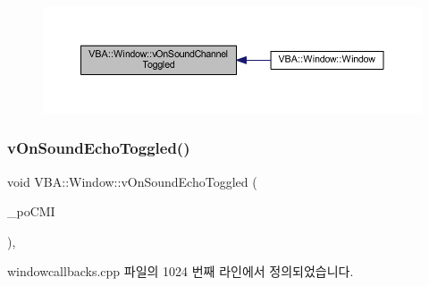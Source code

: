 \begin{figure}[H]
\begin{center}
\leavevmode
\includegraphics[width=350pt]{class_v_b_a_1_1_window_aa64899ec70d7a82ab4eee24567585f3b_icgraph}
\end{center}
\end{figure}
\mbox{\label{class_v_b_a_1_1_window_acf58efc519acc8f3fd42b0e3481eff23}} 
\subsubsection{\texorpdfstring{v\+On\+Sound\+Echo\+Toggled()}{vOnSoundEchoToggled()}}
{\footnotesize\ttfamily void V\+B\+A\+::\+Window\+::v\+On\+Sound\+Echo\+Toggled (\begin{DoxyParamCaption}\item[{Gtk\+::\+Check\+Menu\+Item $\ast$}]{\+\_\+po\+C\+MI }\end{DoxyParamCaption})\hspace{0.3cm}{\ttfamily [protected]}, {\ttfamily [virtual]}}



windowcallbacks.\+cpp 파일의 1024 번째 라인에서 정의되었습니다.


